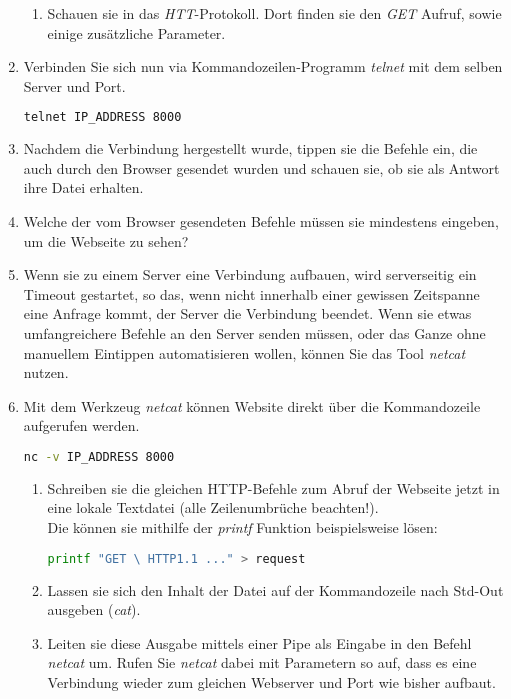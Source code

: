 \documentclass[paper=a4,fontsize=11pt]{scrartcl}%
\numberwithin{equation}{section}
\begin{document}
\begin{enumerate}
\begin{enumerate}
		\item Schauen sie in das \emph{HTT}-Protokoll. Dort finden sie den \emph{GET} Aufruf, sowie einige zusätzliche Parameter.
	\end{enumerate}
	\item Verbinden Sie sich nun via Kommandozeilen-Programm \emph{telnet} mit dem selben Server und Port.	
	\begin{lstlisting}[style=Bash, language=Bash]
telnet IP_ADDRESS 8000
\end{lstlisting}
	\item Nachdem die Verbindung hergestellt wurde, tippen sie die Befehle ein, die auch durch den Browser gesendet wurden und schauen sie, ob sie als Antwort ihre  Datei erhalten.
	\item Welche der vom Browser gesendeten Befehle müssen sie mindestens eingeben, um die Webseite zu sehen?
	\item Wenn sie zu einem Server eine Verbindung aufbauen, wird serverseitig ein Timeout gestartet, so das, wenn nicht innerhalb einer gewissen Zeitspanne eine Anfrage kommt, der Server die Verbindung beendet. Wenn sie etwas umfangreichere Befehle an den Server senden müssen, oder das Ganze ohne manuellem Eintippen automatisieren wollen, können Sie das Tool \emph{netcat} nutzen.	
	\item Mit dem Werkzeug \emph{netcat} können Website direkt über die Kommandozeile aufgerufen werden.
	\begin{lstlisting}[style=Bash, language=Bash]
nc -v IP_ADDRESS 8000
\end{lstlisting}
	\begin{enumerate}
		\item Schreiben sie die gleichen HTTP-Befehle zum Abruf der Webseite jetzt in eine lokale Textdatei (alle Zeilenumbrüche beachten!).\\
		Die können sie mithilfe der \emph{printf} Funktion beispielsweise lösen:
		\begin{lstlisting}[style=Bash, language=Bash]
printf "GET \ HTTP1.1 ..." > request
\end{lstlisting}
		\item Lassen sie sich den Inhalt der Datei auf der Kommandozeile nach Std-Out ausgeben (\emph{cat}).
		\item Leiten sie diese Ausgabe mittels einer Pipe als Eingabe in den Befehl \emph{netcat} um. Rufen Sie \emph{netcat} dabei mit  Parametern so auf, dass es eine Verbindung wieder zum gleichen Webserver und Port wie bisher aufbaut.\\

\end{enumerate}
\end{enumerate}
\end{document}
